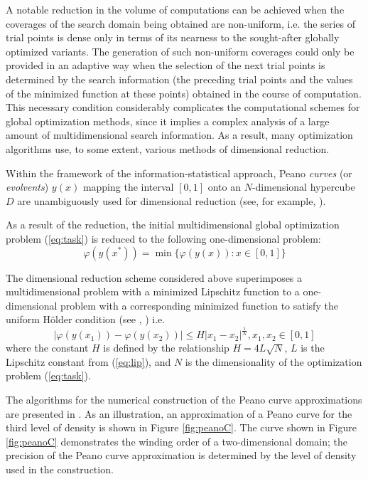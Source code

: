 \documentclass{gOMS2e}
\theoremstyle{plain}%
\theoremstyle{definition}
\theoremstyle{remark}
\begin{document}
A notable reduction in the volume of computations can be achieved when the coverages of the
search domain being obtained are non-uniform, i.e. the series of trial points is dense
only in terms of its nearness to the sought-after globally optimized variants.
The generation of such non-uniform coverages could only be provided in an adaptive
way when the selection of the next trial points is determined by the search information
(the preceding trial points and the values of the minimized function at these points)
obtained in the course of computation. This necessary condition considerably
complicates the computational schemes for global optimization methods, since it
implies a complex analysis of a large amount of multidimensional search information.
As a result, many optimization algorithms use, to some extent, various methods of dimensional reduction.
\par
Within the framework of the information-statistical approach, Peano \textit{curves} (or \textit{evolvents})
\(y(x)\) mapping the interval \([0, 1]\) onto an \(N\)-dimensional hypercube \(D\) are
unambiguously used for dimensional reduction (see, for example, \cite{strSergGO}).
\par
As a result of the reduction, the initial multidimensional global optimization
problem (\ref{eq:task}) is reduced to the following one-dimensional problem:
\begin{equation}
\label{eq:oneDimTask}
\varphi(y(x^*))=\min\{\varphi(y(x)):x\in [0,1]\}
\end{equation}
\par
The dimensional reduction scheme considered above superimposes a multidimensional
problem with a minimized Lipschitz function to a one-dimensional problem with a
corresponding minimized function to satisfy the uniform H{\"o}lder condition (see \cite{strongin1978}, \cite{strSergGO}) i.e.
\begin{equation}
\label{eq:holder}
|\varphi(y(x_1))-\varphi(y(x_2))|\leqslant H{|x_1-x_2|}^{\frac{1}{N}},x_1,x_2\in[0,1]
\end{equation}
where the constant \(H\) is defined by the relationship \(H=4L\sqrt{N}\), \(L\) is the
Lipschitz constant from (\ref{eq:lip}), and \(N\) is the dimensionality of the optimization problem (\ref{eq:task}).
\par
The algorithms for the numerical construction of the Peano curve approximations are presented in \cite{strSergGO}.
As an illustration, an approximation of a Peano curve for the third level of density is
shown in Figure \ref{fig:peanoC}. The curve shown in Figure \ref{fig:peanoC} demonstrates the winding order of a
two-dimensional domain; the precision of the Peano curve approximation is determined by the
level of density used in the construction.
\end{document}
